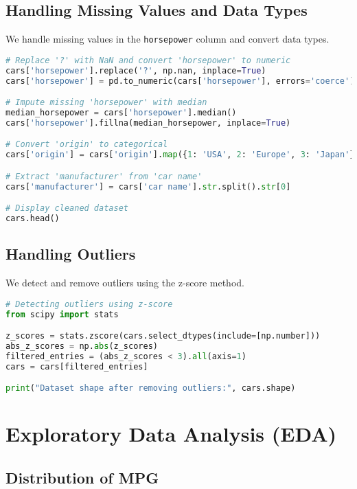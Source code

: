 \documentclass{article}
\begin{document}
\subsection{Handling Missing Values and Data Types}

We handle missing values in the \texttt{horsepower} column and convert data types.

\begin{lstlisting}[language=Python]
# Replace '?' with NaN and convert 'horsepower' to numeric
cars['horsepower'].replace('?', np.nan, inplace=True)
cars['horsepower'] = pd.to_numeric(cars['horsepower'], errors='coerce')

# Impute missing 'horsepower' with median
median_horsepower = cars['horsepower'].median()
cars['horsepower'].fillna(median_horsepower, inplace=True)

# Convert 'origin' to categorical
cars['origin'] = cars['origin'].map({1: 'USA', 2: 'Europe', 3: 'Japan'})

# Extract 'manufacturer' from 'car name'
cars['manufacturer'] = cars['car name'].str.split().str[0]

# Display cleaned dataset
cars.head()
\end{lstlisting}

\subsection{Handling Outliers}

We detect and remove outliers using the z-score method.

\begin{lstlisting}[language=Python]
# Detecting outliers using z-score
from scipy import stats

z_scores = stats.zscore(cars.select_dtypes(include=[np.number]))
abs_z_scores = np.abs(z_scores)
filtered_entries = (abs_z_scores < 3).all(axis=1)
cars = cars[filtered_entries]

print("Dataset shape after removing outliers:", cars.shape)
\end{lstlisting}

\section{Exploratory Data Analysis (EDA)}

\subsection{Distribution of MPG}
\end{document}
